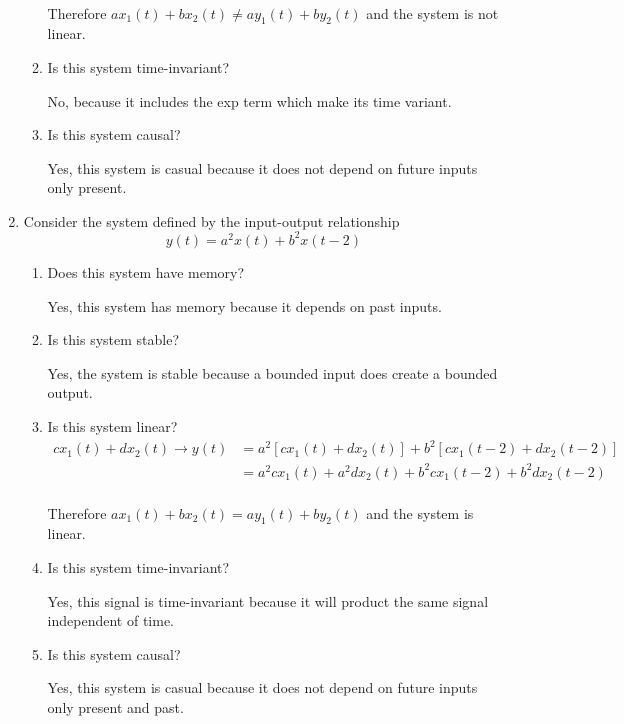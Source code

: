 \documentclass{article}
\begin{document}
\begin{enumerate}
\begin{enumerate}
\begin{align}
        \end{align}
        \begin{center}
            Therefore $ax_1(t) + bx_2(t) \ne ay_1(t) + by_2(t)$ and the system is not linear.
        \end{center}
        \item Is this system time-invariant?
        \begin{center}
            No, because it includes the exp term which make its time variant.
        \end{center}
        \item Is this system causal?
        \begin{center}
            Yes, this system is casual because it does not depend on future inputs only present.
        \end{center}
    \end{enumerate}
    \newpage
    \item Consider the system defined by the input-output relationship
    \begin{equation}
        y(t) = a^2x(t) + b^2x(t-2)
    \end{equation}
    \begin{enumerate}
        \item Does this system have memory?
        \begin{center}
            Yes, this system has memory because it depends on past inputs.
        \end{center}
        \item Is this system stable?
        \begin{center}
            Yes, the system is stable because a bounded input does create a bounded output.
        \end{center}
        \item Is this system linear?
        \begin{align}
            cx_1(t) + dx_2(t) \rightarrow y(t) &= a^2[cx_1(t) + dx_2(t)] + b^2[cx_1(t-2) + dx_2(t-2)]\\
            &= a^2cx_1(t) + a^2dx_2(t) + b^2cx_1(t-2) + b^2dx_2(t-2)\\
        \end{align}
        \begin{center}
            Therefore $ax_1(t) + bx_2(t) = ay_1(t) + by_2(t)$ and the system is linear.
        \end{center}
        \item Is this system time-invariant?
        \begin{center}
            Yes, this signal is time-invariant because it will product the same signal independent of time.
        \end{center}
        \item Is this system causal?
        \begin{center}
            Yes, this system is casual because it does not depend on future inputs only present and past.
        \end{center}
    \end{enumerate}
\end{enumerate}
\end{document}
